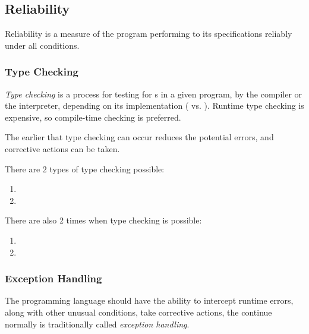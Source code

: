 \subsection{Reliability}\label{subsec:Reliability}
Reliability is a measure of the program performing to its specifications reliably under all conditions.

\subsubsection{Type Checking}\label{subsubsec:Type_Checking}
\begin{definition}\label{def:Type_Checking}
  \emph{Type checking} is a process for testing for s in a given program, by the compiler or the interpreter, depending on its implementation ( vs. ).
  Runtime type checking is expensive, so compile-time checking is preferred.

  \begin{remark}
    The earlier that type checking can occur reduces the potential errors, and corrective actions can be taken.
  \end{remark}

  There are 2 types of type checking possible:
  \begin{enumerate}[noitemsep]
  \item {}
  \item {}
  \end{enumerate}

  There are also 2 times when type checking is possible:
  \begin{enumerate}[noitemsep]
  \item {}
  \item {}
  \end{enumerate}
\end{definition}

\subsubsection{Exception Handling}\label{subsubsec:Exception_Handling}
The programming language should have the ability to intercept runtime errors, along with other unusual conditions, take corrective actions, the continue normally is traditionally called \emph{exception handling}.

